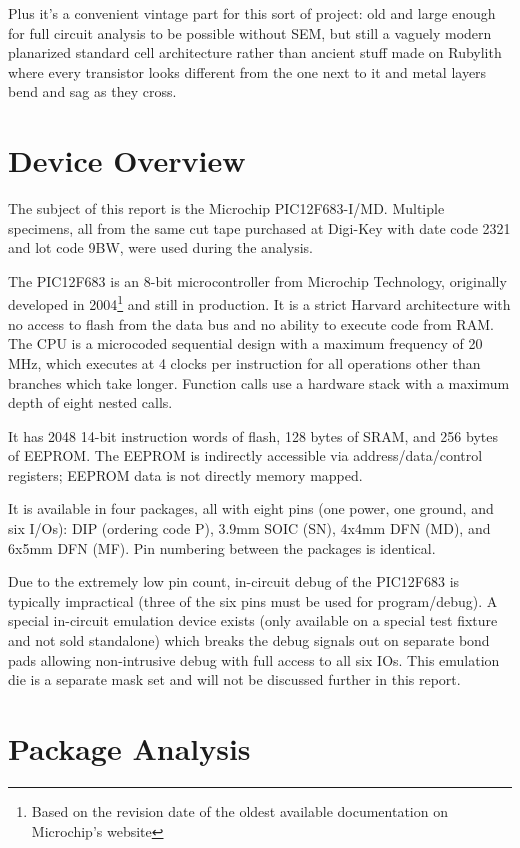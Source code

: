 \documentclass[letterpaper]{article}
\begin{document}
Plus it's a convenient vintage part for this sort of project: old and large enough for full circuit analysis to be possible without SEM, but still a vaguely modern planarized standard cell architecture rather than ancient stuff made on Rubylith where every transistor looks different from the one next to it and metal layers bend and sag as they cross.

\pagebreak
\section{Device Overview}

The subject of this report is the Microchip PIC12F683-I/MD. Multiple specimens, all from the same cut tape purchased at Digi-Key with date code 2321 and lot code 9BW, were used during the analysis.

The PIC12F683 is an 8-bit microcontroller from Microchip Technology, originally developed in 2004\footnote{Based on the revision date of the oldest available documentation on Microchip's website} and still in production. It is a strict Harvard architecture with no access to flash from the data bus and no ability to execute code from RAM. The CPU is a microcoded sequential design with a maximum frequency of 20 MHz, which executes at 4 clocks per instruction for all operations other than branches which take longer. Function calls use a hardware stack with a maximum depth of eight nested calls.

It has 2048 14-bit instruction words of flash, 128 bytes of SRAM, and 256 bytes of EEPROM. The EEPROM is indirectly accessible via address/data/control registers; EEPROM data is not directly memory mapped.

It is available in four packages, all with eight pins (one power, one ground, and six I/Os): DIP (ordering code P), 3.9mm SOIC (SN), 4x4mm DFN (MD), and 6x5mm DFN (MF). Pin numbering between the packages is identical.

Due to the extremely low pin count, in-circuit debug of the PIC12F683 is typically impractical (three of the six pins must be used for program/debug). A special in-circuit emulation device exists (only available on a special test fixture and not sold standalone) which breaks the debug signals out on separate bond pads allowing non-intrusive debug with full access to all six IOs. This emulation die is a separate mask set and will not be discussed further in this report.

\pagebreak
\section{Package Analysis}
\end{document}
